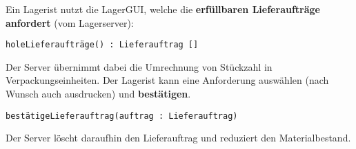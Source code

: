 Ein Lagerist nutzt die LagerGUI, welche die \textbf{erfüllbaren Lieferaufträge anfordert} (vom Lagerserver):

\texttt{holeLieferaufträge() : Lieferauftrag []}

Der Server übernimmt dabei die Umrechnung von Stückzahl in Verpackungseinheiten.
Der Lagerist kann eine Anforderung auswählen (nach Wunsch auch ausdrucken) und \textbf{bestätigen}.

\texttt{bestätigeLieferauftrag(auftrag : Lieferauftrag)}

Der Server löscht daraufhin den Lieferauftrag und reduziert den Materialbestand.